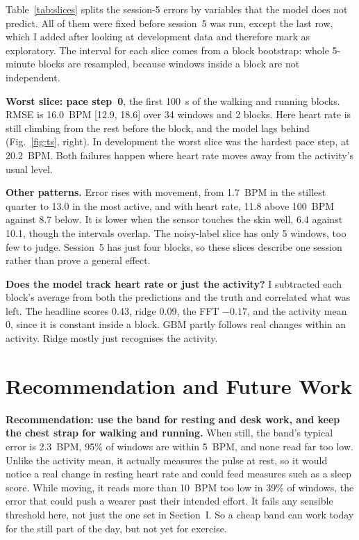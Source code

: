 \documentclass[conference]{IEEEtran}
\begin{document}
Table~\ref{tab:slices} splits the session-5 errors by variables that the model does not predict. All of them were fixed before session~5 was run, except the last row, which I added after looking at development data and therefore mark as exploratory. The interval for each slice comes from a block bootstrap: whole 5-minute blocks are resampled, because windows inside a block are not independent.

\textbf{Worst slice: pace step~0}, the first 100~s of the walking and running blocks. RMSE is 16.0~BPM [12.9, 18.6] over 34 windows and 2 blocks. Here heart rate is still climbing from the rest before the block, and the model lags behind (Fig.~\ref{fig:ts}, right). In development the worst slice was the hardest pace step, at 20.2~BPM. Both failures happen where heart rate moves away from the activity's usual level.

\textbf{Other patterns.} Error rises with movement, from 1.7~BPM in the stillest quarter to 13.0 in the most active, and with heart rate, 11.8 above 100~BPM against 8.7 below. It is lower when the sensor touches the skin well, 6.4 against 10.1, though the intervals overlap. The noisy-label slice has only 5 windows, too few to judge. Session~5 has just four blocks, so these slices describe one session rather than prove a general effect.

\textbf{Does the model track heart rate or just the activity?} I subtracted each block's average from both the predictions and the truth and correlated what was left. The headline scores 0.43, ridge 0.09, the FFT $-0.17$, and the activity mean 0, since it is constant inside a block. GBM partly follows real changes within an activity. Ridge mostly just recognises the activity.

\section{Recommendation and Future Work}
\textbf{Recommendation: use the band for resting and desk work, and keep the chest strap for walking and running.} When still, the band's typical error is 2.3~BPM, 95\% of windows are within 5~BPM, and none read far too low. Unlike the activity mean, it actually measures the pulse at rest, so it would notice a real change in resting heart rate and could feed measures such as a sleep score. While moving, it reads more than 10~BPM too low in 39\% of windows, the error that could push a wearer past their intended effort. It fails any sensible threshold here, not just the one set in Section~I. So a cheap band can work today for the still part of the day, but not yet for exercise.
\end{document}
